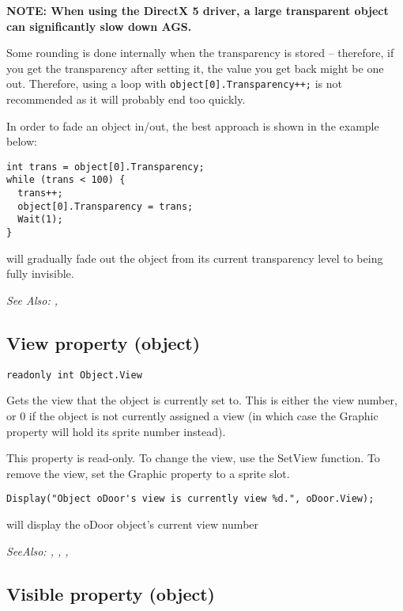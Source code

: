 \bf{NOTE:} When using the DirectX 5 driver, a large transparent object can significantly slow
down AGS.

Some rounding is done internally when the transparency is stored -- therefore, if you get
the transparency after setting it, the value you get back might be one out. Therefore, using
a loop with \verb$object[0].Transparency++;$ is not recommended as it will probably
end too quickly.

In order to fade an object in/out, the best approach is shown in the example below:

\begin{verbatim}
int trans = object[0].Transparency;
while (trans < 100) {
  trans++;
  object[0].Transparency = trans;
  Wait(1);
}
\end{verbatim}
will gradually fade out the object from its current transparency level to being fully
invisible.

\it{See Also:} ,


\subsection{View property (object)}\label{Object.View}%

\begin{verbatim}
readonly int Object.View
\end{verbatim}
Gets the view that the object is currently set to. This is either the view number, or 0
if the object is not currently assigned a view (in which case the Graphic property will
hold its sprite number instead).

This property is read-only. To change the view, use the SetView function. To remove
the view, set the Graphic property to a sprite slot.

\begin{verbatim}
Display("Object oDoor's view is currently view %d.", oDoor.View);
\end{verbatim}
will display the oDoor object's current view number

\it{SeeAlso:} ,
, ,


\subsection{Visible property (object)}\label{Object.Visible}%

